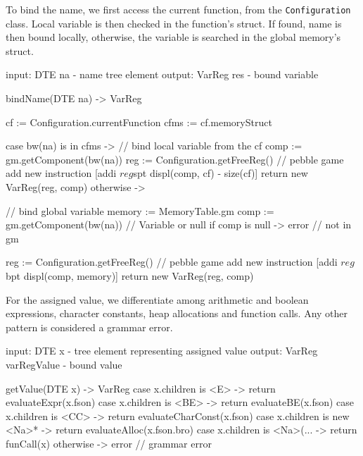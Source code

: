 To bind the name, we first access the current function, from the \verb+Configuration+ class. Local variable
is then checked in the function's struct. If found, name is then bound locally, otherwise, the variable is searched
in the global memory's struct.
\begin{codeblock}
input: DTE na - name tree element
output: VarReg res - bound variable

bindName(DTE na) -> VarReg {
    cf := Configuration.currentFunction
    cfms := cf.memoryStruct

    case bw(na) is in cfms -> { // bind local variable from the cf
        comp := gm.getComponent(bw(na))
        reg := Configuration.getFreeReg() // pebble game
        add new instruction [addi $reg $spt displ(comp, cf) - size(cf)]
        return new VarReg(reg, comp)
    }
    otherwise -> { // bind global variable
        memory := MemoryTable.gm
        comp := gm.getComponent(bw(na)) // Variable or null
        if comp is null -> { error } // not in gm

        reg := Configuration.getFreeReg() // pebble game
        add new instruction [addi $reg $bpt displ(comp, memory)]
        return new VarReg(reg, comp)
    }
}
\end{codeblock}

For the assigned value, we differentiate among arithmetic and boolean expressions, character constants,
heap allocations and function calls. Any other pattern is considered a grammar error.
\begin{codeblock}
input: DTE x - tree element representing assigned value
output: VarReg varRegValue - bound value

getValue(DTE x) -> VarReg {
    case x.children is <E> -> return evaluateExpr(x.fson)
    case x.children is <BE> -> return evaluateBE(x.fson)
    case x.children is <CC> -> return evaluateCharConst(x.fson)
    case x.children is new <Na>* -> return evaluateAlloc(x.fson.bro)
    case x.children is <Na>(... -> return funCall(x)
    otherwise -> error // grammar error
}
\end{codeblock}

